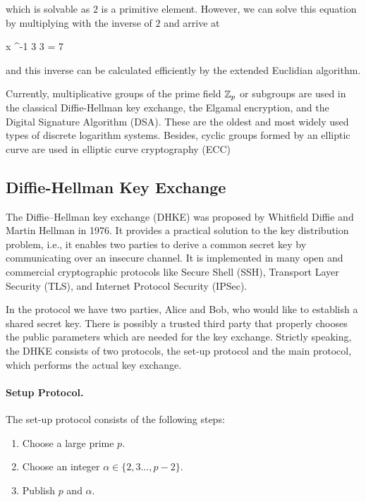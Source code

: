 which is solvable as $2$ is a primitive element. However, we can solve this equation by multiplying with the inverse of $2$ and arrive at

\bee
x ^{-1} 3   3  = 7 
\eee

and this inverse can be calculated efficiently by the extended Euclidian algorithm.

Currently, multiplicative groups of the prime field $\mathbb{Z}_p$ or subgroups are used in the classical Diffie-Hellman key exchange, the Elgamal encryption, and the Digital Signature Algorithm (DSA). These are the oldest and most widely used types of discrete logarithm systems. Besides, cyclic groups formed by an elliptic curve are used in elliptic curve cryptography (ECC)

\subsection{Diffie-Hellman Key Exchange}

The Diffie–Hellman key exchange (DHKE) was proposed by Whitfield Diffie and Martin Hellman in 1976. It provides a practical solution to the key distribution problem, i.e., it enables two parties to derive a common secret key by communicating over an insecure channel. It is implemented in many open and commercial cryptographic protocols like Secure Shell (SSH), Transport Layer Security (TLS), and Internet Protocol Security (IPSec).

In the protocol we have two parties, Alice and Bob, who would like to establish a shared secret key. There is possibly a trusted third party that properly chooses the public parameters which are needed for the key exchange. Strictly speaking, the DHKE consists of two protocols, the set-up protocol and the main protocol, which performs the actual key exchange.

\paragraph{Setup Protocol.} The set-up protocol consists of the following steps: 

\begin{enumerate}
	\item Choose a large prime $p$.
	\item Choose an integer $\alpha \in \{2,3\ldots, p-2\}$.
	\item Publish $p$ and $\alpha$.
\end{enumerate}

